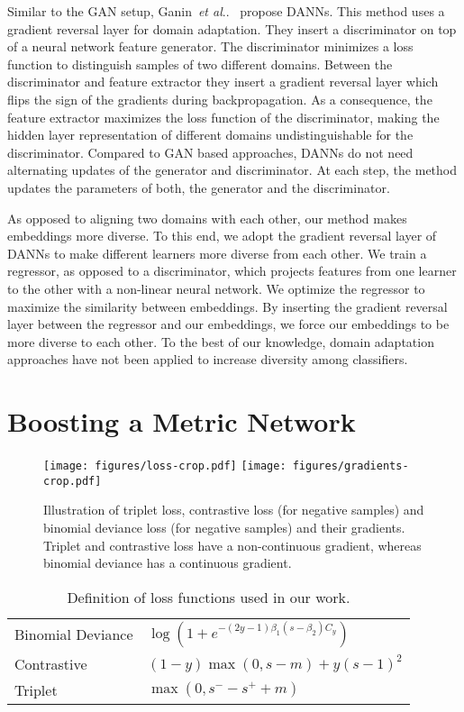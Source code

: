 \documentclass[10pt,journal,compsoc]{IEEEtran}
\makeatletter
\DeclareRobustCommand\onedot{\futurelet\@let@token\@onedot}
\def\@onedot{\ifx\@let@token.\else.\null\fi\xspace}
\def\etal{\emph{et al}\onedot}
\makeatother
\begin{document}
Similar to the \ac{GAN} setup, Ganin~\etal~\cite{ganin2016domain} propose \acp{DANN}. This method uses a gradient reversal layer for domain adaptation. 
They insert a discriminator on top of a neural network feature generator. The discriminator minimizes a loss function 
to distinguish samples of two different domains. Between the discriminator and feature extractor they insert a gradient reversal
layer which flips the sign of the gradients during backpropagation. As a consequence, the feature extractor maximizes the loss
function of the discriminator, making the hidden layer representation of different domains undistinguishable for the 
discriminator. Compared to \ac{GAN} based approaches, \acp{DANN} do not need alternating updates
of the generator and discriminator. At each step, the method updates the parameters of both, the generator and the discriminator.

As opposed to aligning two domains with each other, our method makes embeddings more diverse. To this end, we 
adopt the gradient reversal layer of \acp{DANN} to make different
learners more diverse from each other. We train a regressor, as opposed to a discriminator,
which projects features from one learner to the other with a non-linear neural
network. We optimize the regressor to maximize the similarity between embeddings. By inserting the gradient reversal
layer between the regressor and our embeddings, we force our embeddings to be more diverse to each other. 
To the best of our knowledge, domain adaptation approaches have not been applied to increase diversity among classifiers.

\section{Boosting a Metric Network}\begin{figure}[t]
    \begin{center}
        \texttt{[image: figures/loss-crop.pdf]}
        \texttt{[image: figures/gradients-crop.pdf]}
    \end{center}
    \caption{Illustration of triplet loss, contrastive loss (for negative samples) and binomial deviance loss (for negative samples) and their gradients.
             Triplet and contrastive loss have a non-continuous gradient, whereas binomial deviance has a continuous gradient.}
    \label{fig:gradients}
\end{figure}\begin{table}[t]
    \caption{Definition of loss functions used in our work.}
    \label{tbl:loss-function-overview}
    \renewcommand{\arraystretch}{1.3}
    \centering
    \begin{tabular}{ll}
        \hline
        Binomial Deviance & $\log(1 + e^{-(2 y - 1) \beta_1 (s - \beta_2) C_y })$ \\
        Contrastive   & $(1 - y) \max(0, s - m) + y (s - 1)^2$ \\
        Triplet       & $\max(0, s^- - s^+ + m)$ \\
        \hline
    \end{tabular}
\end{table}
\end{document}
